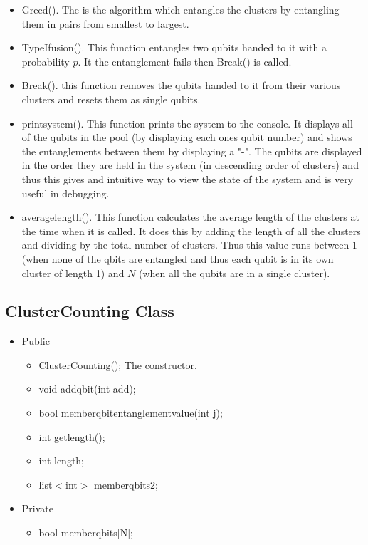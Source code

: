 \documentclass{article}
\numberwithin{equation}{section} %
\begin{document}
\begin{itemize}
\item Greed(). The is the algorithm which entangles the clusters by entangling them in pairs from smallest to largest. 

\item TypeIfusion(). This function entangles two qubits handed to it with a probability $p$. It the entanglement fails then Break() is called.

\item Break(). this function removes the qubits handed to it from their various clusters and resets them as single qubits. 

\item print\textunderscore system(). This function prints the system to the console. It displays all of the qubits in the pool (by displaying each ones qubit number) and shows the entanglements between them by displaying a "-". The qubits are displayed in the order they are held in the system (in descending order of clusters) and thus this gives and intuitive way to view the state of the system and is very useful in debugging. 

\item average\textunderscore length(). This function calculates the average length of the clusters at the time when it is called. It does this by adding the length of all the clusters and dividing by the total number of clusters. Thus this value runs between 1 (when none of the qbits are entangled and thus each qubit is in its own cluster of length 1) and $N$ (when all the qubits are in a single cluster). 

\end{itemize}

\subsection{ClusterCounting Class}

\begin{itemize}
\item Public
\begin{itemize}

\item ClusterCounting(); The constructor.
\item void add\textunderscore qbit(int add);
\item bool memberqbit\textunderscore entanglementvalue(int j);
\item int get\textunderscore length();
\item int length;
\item list$<$int$>$ memberqbits2;

\end{itemize}

\item Private
\begin{itemize}
\item bool memberqbits[N];
   
\end{itemize}

\end{itemize}
\end{document}
